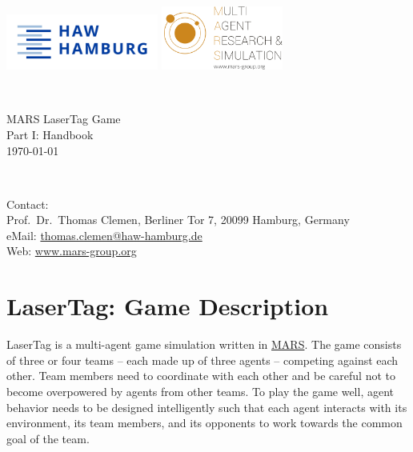 \documentclass[a4paper,english,DIV=16,11pt,parskip=half,dvipsnames,listof=totoc,index=totoc,bibliography=totoc]{scrartcl}
\begin{document}
	
\begin{titlepage}		
	\begin{minipage}{\textwidth}
		\noindent
		\includegraphics[width=5cm]{../logos/HAW_Hamburg.jpeg}
		\hfill
		\includegraphics[width=4cm]{../logos/mars_logo.png}
	\end{minipage}\\
		
	\vspace{5cm}
		
	\begin{minipage}{\textwidth}
		\noindent
		\centering
		{\huge MARS LaserTag Game}\\[0.5cm]
		{\LARGE Part I: Handbook}\\[0.5cm]
		{\large \textsf{\today}}
	\end{minipage}\\
		
	\vfill
		
	\begin{framed}
		\begin{minipage}{\textwidth}
			Contact:\\ Prof.~Dr.~Thomas Clemen, Berliner Tor 7, 20099 Hamburg, Germany\\
			eMail: \href{mailto:thomas.clemen@haw-hamburg.de}{thomas.clemen@haw-hamburg.de}\\
			Web: \url{www.mars-group.org}
		\end{minipage}
			
	\end{framed}
\end{titlepage}

\section*{LaserTag: Game Description}
LaserTag is a multi-agent game simulation written in \href{https://mars-group-haw.github.io/index.html}{MARS}. The game consists of three or four teams -- each made up of three agents -- competing against each other. Team members need to coordinate with each other and be careful not to become overpowered by agents from other teams. To play the game well, agent behavior needs to be designed intelligently such that each agent interacts with its environment, its team members, and its opponents to work towards the common goal of the team.
\end{document}
